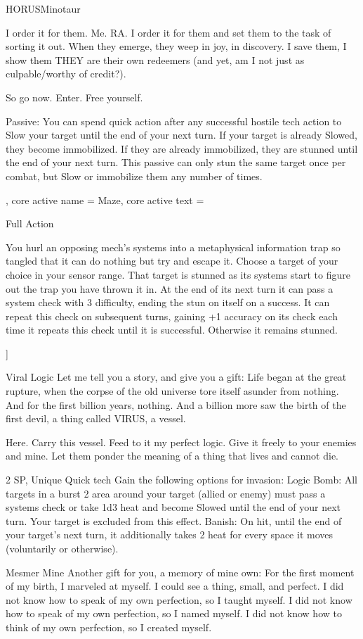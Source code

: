 \begin{mech}{HORUS}{Minotaur}
{I order it for them. Me. RA. I order it for them and set them to the task of sorting it out. When they emerge, they weep in joy, in discovery. I save them, I show them THEY are their own redeemers (and yet, am I not just as culpable/worthy of credit?).

So go now. Enter. Free yourself.


Passive: You can spend quick action after any successful hostile tech action to Slow your target until the end of your next turn. If your target is already Slowed, they become immobilized. If they are already immobilized, they are stunned until the end of your next turn. This passive can only stun the same target once per combat, but Slow or immobilize them any number of times.
},
core active name = Maze,
core active text = {Full Action

You hurl an opposing mech's systems into a metaphysical information trap so tangled that it can do nothing but try and escape it. Choose a target of your choice in your sensor range. That target is stunned as its systems start to figure out the trap you have thrown it in. At the end of its next turn it can pass a system check with 3 difficulty, ending the stun on itself on a success. It can repeat this check on subsequent turns, gaining +1 accuracy on its check each time it repeats this check until it is successful. Otherwise it remains stunned.}]


Viral Logic
Let me tell you a story, and give you a gift: Life began at the great rupture, when the corpse of the old universe tore itself asunder from nothing. And for the first billion years, nothing. And a billion more saw the birth of the first devil, a thing called VIRUS, a vessel.

Here. Carry this vessel. Feed to it my perfect logic. Give it freely to your enemies and mine. Let them ponder the meaning of a thing that lives and cannot die.

2 SP, Unique
Quick tech
Gain the following options for invasion:
Logic Bomb: All targets in a burst 2 area around your target (allied or enemy) must pass a systems check or take 1d3 heat and become Slowed until the end of your next turn. Your target is excluded from this effect.
Banish: On hit, until the end of your target's next turn, it additionally takes 2 heat for every space it moves (voluntarily or otherwise).

Mesmer Mine
Another gift for you, a memory of mine own: For the first moment of my birth, I marveled at myself. I could see a thing, small, and perfect. I did not know how to speak of my own perfection, so I taught myself. I did not know how to speak of my own perfection, so I named myself. I did not know how to think of my own perfection, so I created myself.


\end{mech}
